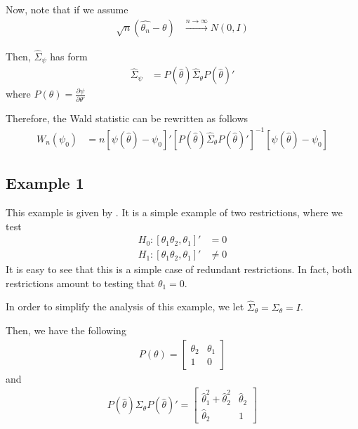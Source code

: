 \documentclass[]{article}\usepackage[]{graphicx}\usepackage[]{color}
\begin{document}
Now, note that if we assume
\begin{align}
	\sqrt{n} ( \hat{\theta_n}- \theta ) & \xrightarrow{n \rightarrow \infty} N(0,I)
\end{align}

Then, $\hat{\Sigma}_\psi$ has form
\begin{align}
	\hat{\Sigma}_\psi & = P(\hat{\theta}) \hat{\Sigma}_\theta P(\hat{\theta})'
\end{align}
where $P(\theta)=\frac{\partial \psi}{\partial \theta'}$

Therefore, the Wald statistic can be rewritten as follows
\begin{align}
	W_n(\psi_0) & = n \left[\psi (\hat{\theta}) - \psi_0\right]' \left[ P(\hat{\theta}) \hat{\Sigma}_\theta P(\hat{\theta})' \right]^{-1} \left[\psi (\hat{\theta}) - \psi_0\right]
\end{align}

\subsection{Example 1}

This example is given by \cite{dufour_rank-robust_2016}. It is a simple example of two restrictions, where we test
\begin{align}
	H_0: [\theta_1 \theta_2 , \theta_1]' & = 0 \\
	H_1: [\theta_1 \theta_2 , \theta_1]'  & \neq 0
\end{align}
It is easy to see that this is a simple case of redundant restrictions. In fact, both restrictions amount to testing that $\theta_1=0$.

In order to simplify the analysis of this example, we let $\hat{\Sigma}_\theta=\Sigma_\theta=I$.

Then, we have the following
\begin{align}
	P(\theta) = \left[\begin{array}{cc}
		\theta_2 & \theta_1 \\
		1 & 0
	\end{array}\right]
\end{align}
and
\begin{align}
	P(\hat{\theta})\Sigma_\theta P(\hat{\theta})' = \left[\begin{array}{cc}
		\hat{\theta}_1^2 + \hat{\theta}_2^2 & \hat{\theta}_2 \\
		\hat{\theta}_2 & 1
	\end{array}\right]
\end{align}
\end{document}
